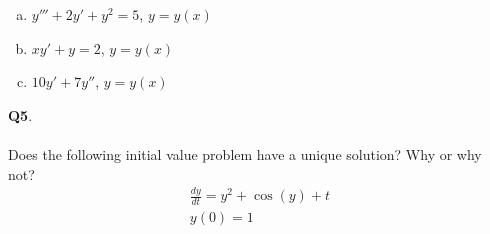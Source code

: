 \documentclass[12pt, oneside]{amsart}
\begin{document}
\vspace{1in}
\begin{enumerate}[a)]
    \item
        $y''' + 2y' + y^{2} = 5$, \quad $y = y(x)$
        \vspace{2in}

    \item
        $xy' + y = 2$, \quad $y = y(x)$
        \vspace{2in}

    \item 
        $10y' + 7y''$, \quad $y = y(x)$
        \vspace{2in}


\end{enumerate}
\newpage
\noindent
\textbf{Q5}. \\ \\ 
Does the following initial value problem have a unique solution? Why or why not?
\begin{gather*}
\frac{dy}{dt} = y^{2} + \cos(y) + t
\\
y(0) = 1
\end{gather*}
\end{document}
